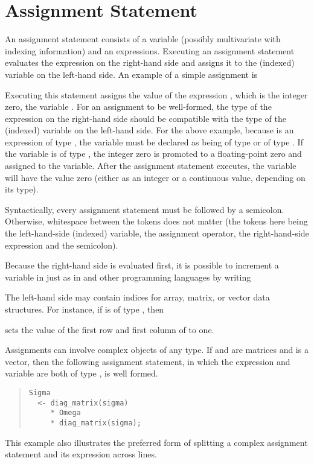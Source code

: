 \section{Assignment Statement}

An assignment statement consists of a variable (possibly multivariate
with indexing information) and an expressions.  Executing an
assignment statement evaluates the expression on the right-hand side
and assigns it to the (indexed) variable on the left-hand side.  An
example of a simple assignment is
%
\begin{quote}
\end{quote}
%
Executing this statement assigns the value of the expression ,
which is the integer zero, the variable .  For an assignment
to be well-formed, the type of the expression on the right-hand side
should be compatible with the type of the (indexed) variable on the
left-hand side.  For the above example, because  is an
expression of type , the variable  must be declared
as being of type  or of type .  If the variable
is of type , the integer zero is promoted to a
floating-point zero and assigned to the variable.  After the
assignment statement executes, the variable  will have the
value zero (either as an integer or a continuous value, depending on
its type).

Syntactically, every assignment statement must be followed by a
semicolon.  Otherwise, whitespace between the tokens does not matter
(the tokens here being the left-hand-side (indexed) variable, the
assignment operator, the right-hand-side expression and the
semicolon).

Because the right-hand side is evaluated first, it is possible to
increment a variable in \Stan just as in \Cpp and other programming
languages by writing
%
\begin{quote}
\end{quote}

The left-hand side may contain indices for array, matrix, or vector
data structures.  For instance, if  is of type
, then 
%
\begin{quote}
\end{quote}
%
sets the value of the first row and first column of  to one.

Assignments can involve complex objects of any type.  If 
and  are matrices and  is a vector, then the
following assignment statement, in which the expression and variable
are both of type , is well formed.
%
\begin{quote}
\begin{Verbatim}
Sigma
  <- diag_matrix(sigma) 
     * Omega 
     * diag_matrix(sigma);
\end{Verbatim}
\end{quote}
%
This example also illustrates the preferred form of splitting a
complex assignment statement and its expression across lines.

